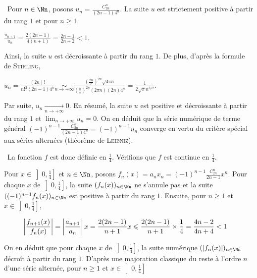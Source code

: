 {{\begin{center}
\fbox{
$\forall x\in\left]- \frac{1}{4}, \frac{1}{4}\right[$, $\sum_{n=0}^{+\infty}(-1)^n \frac{C_{2n}^n}{2n-1}x^n=\sqrt{1+4x}$.
}
\end{center}

\textbullet~Pour $n\in\Nn$, posons $u_n= \frac{C_{2n}^n}{(2n-1)4^n}$. La suite $u$ est strictement positive à partir du rang $1$ et pour $n\geqslant1$, 

\begin{center}
$ \frac{u_{n+1}}{u_n}= \frac{2(2n-1)}{4(n+1)}= \frac{2n-1}{2n+2}<1$.
\end{center}

Ainsi, la suite $u$ est décroissante à partir du rang $1$. De plus, d'après la formule de \textsc{Stirling},

\begin{center}
$u_n= \frac{(2n)!}{n!^2(2n-1)4^n}\underset{n\rightarrow+\infty}{\sim} \frac{\left( \frac{2n}{e}\right)^{2n}\sqrt{4\pi n}}{\left( \frac{n}{e}\right)^{2n}(2\pi n)(2n)4^n}= \frac{1}{2\sqrt{\pi}n^{3/2}}$.
\end{center}

Par suite, $u_n\underset{n\rightarrow+\infty}{\rightarrow}0$. En résumé, la suite $u$ est positive et décroissante à partir du rang $1$ et $\lim_{n \rightarrow +\infty}u_n=0$. On en déduit que la série numérique de terme général $(-1)^{n-1} \frac{C_{2n}^n}{(2n-1)4^n}=(-1)^{n-1}u_n$ converge en vertu du critère spécial aux séries alternées (théorème de \textsc{Leibniz}).

\textbullet~La fonction $f$ est donc définie en $ \frac{1}{4}$. Vérifions que $f$ est continue en $ \frac{1}{4}$.

Pour  $x\in\left]0, \frac{1}{4}\right]$ et $n\in\Nn$, posons $f_n(x)=a_nx_n=(-1)^{n-1} \frac{C_{2n}^n}{2n-1}x^n$. Pour chaque $x$ de $\left]0, \frac{1}{4}\right]$, la suite $(f_n(x))_{n\in\Nn}$ ne s'annule pas et la suite $((-1)^{n-1}f_n(x))_{n\in\Nn}$ est positive à partir du rang $1$. Ensuite, pour $n\geqslant1$ et $x\in\left]0, \frac{1}{4}\right]$,

\begin{align*}\ensuremath
\left| \frac{f_{n+1}(x)}{f_n(x)}\right|&=\left| \frac{a_{n+1}}{a_n}\right|x= \frac{2(2n-1)}{n+1}x\leqslant \frac{2(2n-1)}{n+1}\times \frac{1}{4}= \frac{4n-2}{4n+4}<1
\end{align*}

On en déduit que pour chaque $x$ de $\left]0, \frac{1}{4}\right]$, la suite numérique $(|f_n(x)|)_{n\in\Nn}$ décroît à partir du rang $1$. D'après une majoration classique du reste à l'ordre $n$ d'une série alternée, pour $n\geqslant1$ et $x\in\left]0, \frac{1}{4}\right]$

}}
